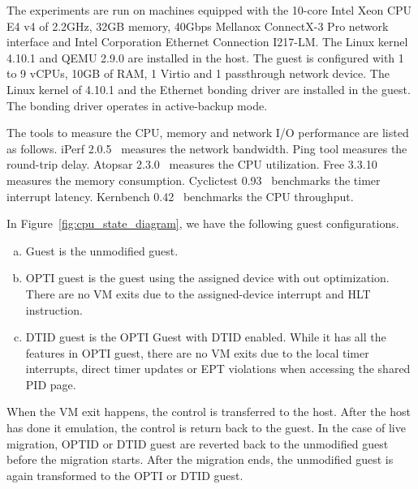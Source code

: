 
The experiments are run on machines equipped with the 10-core
Intel Xeon CPU E4 v4 of 2.2GHz, 32GB memory, 40Gbps Mellanox
ConnectX-3 Pro network interface and Intel Corporation
Ethernet Connection I217-LM. The Linux kernel 4.10.1 and QEMU
2.9.0 are installed in the host. The guest is configured with
1 to 9 vCPUs, 10GB of RAM, 1 Virtio and 1 passthrough network
device. The Linux kernel of 4.10.1 and the Ethernet bonding
driver are installed in the guest. The bonding driver operates
in active-backup mode.

The tools to measure the CPU, memory and network I/O
performance are listed as follows. iPerf 2.0.5~\cite{iperf}
measures the network bandwidth. Ping tool measures the
round-trip delay. Atopsar 2.3.0~\cite{atopsar} measures the
CPU utilization. Free 3.3.10~\cite{free} measures the memory
consumption. Cyclictest 0.93~\cite{cyclictest} benchmarks the
timer interrupt latency. Kernbench 0.42~\cite{kernbench}
benchmarks the CPU throughput.

In Figure~\ref{fig:cpu_state_diagram}, we have the following
guest configurations.
\begin{enumerate}[(a)]
  \item Guest is the unmodified guest.
  \item OPTI guest is the guest using the assigned device with
  out optimization. There are no VM exits due to the
  assigned-device interrupt and HLT instruction.
  \item DTID guest is the OPTI Guest with DTID enabled. While
  it has all the features in OPTI guest, there are no VM exits
  due to the local timer interrupts, direct timer updates or
  EPT violations when accessing the shared PID page.
\end{enumerate}
When the VM exit happens, the control is transferred to the
host. After the host has done it emulation, the control is
return back to the guest. In the case of live migration, OPTID
or DTID guest are reverted back to the unmodified guest before
the migration starts. After the migration ends, the unmodified
guest is again transformed to the OPTI or DTID guest.
